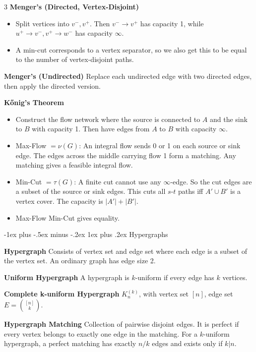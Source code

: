 \documentclass[10pt, landscape]{article}
\makeatletter
\renewcommand{\subsection}{\@startsection{subsection}{3}{0mm}%
                                {-1ex plus -.5ex minus -.2ex}%
                                {1ex plus .2ex}%
                                {\normalfont\small\bfseries}}%
\makeatother
\begin{document}
\begin{multicols*}{3}
\textbf{Menger's (Directed, Vertex-Disjoint)}
\begin{itemize}
    \item Split vertices into $v^-, v^+$. Then $v^-\rightarrow v^+$ has capacity 1, while $u^+ \rightarrow v^-, v^+\rightarrow w^-$ has capacity $\infty$.
    \item A min-cut corresponds to a vertex separator, so we also get this to be equal to the number of vertex-disjoint paths.
\end{itemize}

\textbf{Menger's (Undirected)} Replace each undirected edge with two directed edges, then apply the directed version.

\textbf{Kőnig's Theorem}
\begin{itemize}
    \item Construct the flow network where the source is connected to $A$ and the sink to $B$ with capacity 1. Then have edges from $A$ to $B$ with capacity $\infty$.
    \item Max-Flow $=\nu(G)$: An integral flow sends 0 or 1 on each source or sink edge. The edges across the middle carrying flow 1 form a matching. Any matching gives a feasible integral flow.
    \item Min-Cut $=\tau(G)$: A finite cut cannot use any $\infty$-edge. So the cut edges are a subset of the source or sink edges. This cuts all $s$-$t$ paths iff $A' \cup B'$ is a vertex cover. The capacity is $|A'|+|B'|$.
    \item Max-Flow Min-Cut gives equality.
\end{itemize}

\subsection{Hypergraphs}

\textbf{Hypergraph} Consists of vertex set and edge set where each edge is a subset of the vertex set. An ordinary graph has edge size 2.

\textbf{Uniform Hypergraph} A hypergraph is $k$-uniform if every edge has $k$ vertices.

\textbf{Complete k-uniform Hypergraph} $K_n^{(k)}$, with vertex set $[n]$, edge set $E={[n] \choose k}$.

\textbf{Hypergraph Matching} Collection of pairwise disjoint edges. It is perfect if every vertex belongs to exactly one edge in the matching. For a $k$-uniform hypergraph, a perfect matching has exactly $n/k$ edges and exists only if $k |n$.


\end{multicols*}
\end{document}
